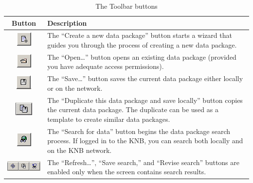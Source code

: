 \begin{table}[ht]
  \centering
  \begin{tabular}{|c|m{}|}
  \hline
  \textbf{Button} & \textbf{Description} \\
  \hline
  \includegraphics[scale=0.7]{images/button-new-dp.png} &
  The ``Create a new data package'' button starts a wizard that guides
  you through the process of creating a new data package. \\
  \hline
  \includegraphics[scale=0.7]{images/button-open.png} &
  The ``Open\ldots'' button opens an existing data package (provided you
  have adequate access permissions). \\
  \hline
  \includegraphics[scale=0.7]{images/button-save.png} &
  The ``Save\ldots'' button saves the current data package either
  locally or on the network. \\
  \hline
  \includegraphics[scale=0.7]{images/button-duplicate.png} &
  The ``Duplicate this data package and save locally'' button copies the
  current data package. The duplicate can be used as a template to
  create similar data packages. \\
  \hline
  \includegraphics[scale=0.7]{images/button-search.png} &
  The ``Search for data'' button begins the data package search process.
  If logged in to the KNB, you can search both locally and on the KNB
  network. \\
  \hline
  \includegraphics[scale=0.7]{images/button-bar-search.png} &
  The ``Refresh…'', ``Save search,'' and ``Revise search'' buttons are
  enabled only when the screen contains search results. \\
  \hline
  \end{tabular}
  \caption{The Toolbar buttons}
  \label{tab:button-bar}
\end{table}


